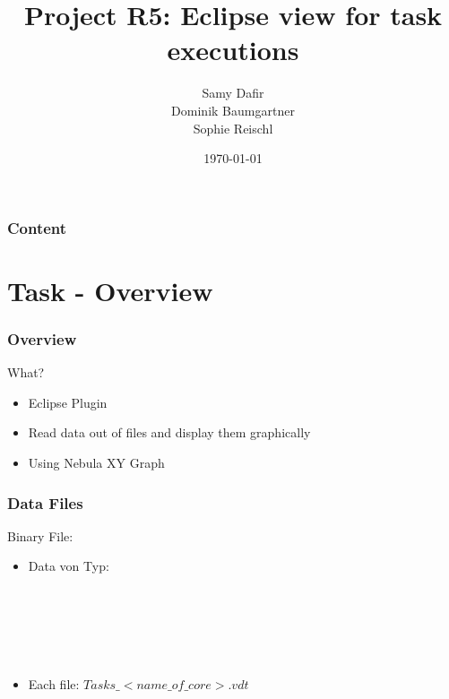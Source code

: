 \documentclass{beamer}
\title{Project R5: Eclipse view for task executions}
\author[]{Samy Dafir\\Dominik Baumgartner\\ Sophie Reischl }
\date{\today}
\begin{document}
\frame{\titlepage}

\begin{frame}
    \frametitle{Content} 
    \tableofcontents 
\end{frame}

\section{Task - Overview}
\begin{frame}
	\frametitle{Overview}
    \begin{block}{What?}
	    \begin{itemize}
		    \item Eclipse Plugin
		    \item Read data out of files and display them graphically 
            \item Using Nebula XY Graph            
	    \end{itemize}
    \end{block}
\end{frame}
\begin{frame}
	\frametitle{Data Files}
    \begin{block}{Binary File:}
	    \begin{itemize}
		    \item Data von Typ:\\
			\\
			\\
			\\
			\\
			\\
		    \item Each file: $Tasks\_<name\_of\_core>.vdt$
	    \end{itemize}
    \end{block}
\end{frame}
\end{document}
